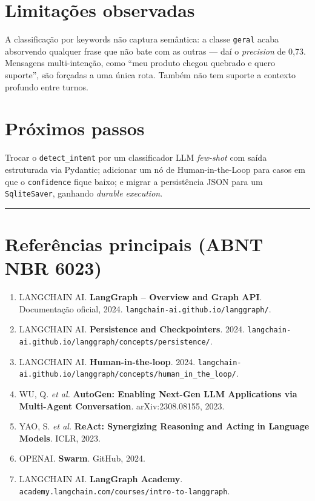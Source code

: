 \documentclass[a4paper,10pt]{article}
\begin{document}
\section*{Limitações observadas}
A classificação por keywords não captura semântica: a classe \texttt{geral} acaba absorvendo qualquer frase que não bate com as outras --- daí o \emph{precision} de 0,73. Mensagens multi-intenção, como ``meu produto chegou quebrado e quero suporte'', são forçadas a uma única rota. Também não tem suporte a contexto profundo entre turnos.

\section*{Próximos passos}
Trocar o \texttt{detect\_intent} por um classificador LLM \emph{few-shot} com saída estruturada via Pydantic; adicionar um nó de Human-in-the-Loop para casos em que o \texttt{confidence} fique baixo; e migrar a persistência JSON para um \texttt{SqliteSaver}, ganhando \emph{durable execution}.

\vspace{2pt}\hrule\vspace{4pt}

\section*{Referências principais (ABNT NBR 6023)}
\footnotesize
\begin{enumerate}
\item LANGCHAIN AI. \textbf{LangGraph -- Overview and Graph API}. Documentação oficial, 2024. \texttt{langchain-ai.github.io/langgraph/}.
\item LANGCHAIN AI. \textbf{Persistence and Checkpointers}. 2024. \texttt{langchain-ai.github.io/langgraph/concepts/persistence/}.
\item LANGCHAIN AI. \textbf{Human-in-the-loop}. 2024. \texttt{langchain-ai.github.io/langgraph/concepts/human\_in\_the\_loop/}.
\item WU, Q. \emph{et al.} \textbf{AutoGen: Enabling Next-Gen LLM Applications via Multi-Agent Conversation}. arXiv:2308.08155, 2023.
\item YAO, S. \emph{et al.} \textbf{ReAct: Synergizing Reasoning and Acting in Language Models}. ICLR, 2023.
\item OPENAI. \textbf{Swarm}. GitHub, 2024.
\item LANGCHAIN AI. \textbf{LangGraph Academy}. \texttt{academy.langchain.com/courses/intro-to-langgraph}.
\end{enumerate}
\end{document}
